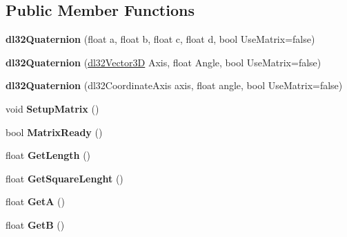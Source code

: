 \subsection*{Public Member Functions}
\begin{DoxyCompactItemize}
\item 
\hypertarget{classdl32_quaternion_adf3ab0776e0a8f458b07e57760c59555}{{\bfseries dl32\-Quaternion} (float a, float b, float c, float d, bool Use\-Matrix=false)}\label{classdl32_quaternion_adf3ab0776e0a8f458b07e57760c59555}

\item 
\hypertarget{classdl32_quaternion_ad6f9e8cb453d5ed618117c129de42d97}{{\bfseries dl32\-Quaternion} (\hyperlink{structdl32_vector3_d}{dl32\-Vector3\-D} Axis, float Angle, bool Use\-Matrix=false)}\label{classdl32_quaternion_ad6f9e8cb453d5ed618117c129de42d97}

\item 
\hypertarget{classdl32_quaternion_a71f6889b137be8410f3a0f977c293b5a}{{\bfseries dl32\-Quaternion} (dl32\-Coordinate\-Axis axis, float angle, bool Use\-Matrix=false)}\label{classdl32_quaternion_a71f6889b137be8410f3a0f977c293b5a}

\item 
\hypertarget{classdl32_quaternion_a28852df36bbf4b337a3b75fa3a21ac92}{void {\bfseries Setup\-Matrix} ()}\label{classdl32_quaternion_a28852df36bbf4b337a3b75fa3a21ac92}

\item 
\hypertarget{classdl32_quaternion_a809258c41ce52c057776bcebfa786561}{bool {\bfseries Matrix\-Ready} ()}\label{classdl32_quaternion_a809258c41ce52c057776bcebfa786561}

\item 
\hypertarget{classdl32_quaternion_a7877f67a1ad096eb97a68278069c3919}{float {\bfseries Get\-Length} ()}\label{classdl32_quaternion_a7877f67a1ad096eb97a68278069c3919}

\item 
\hypertarget{classdl32_quaternion_ab71d49a075b60f13083e1c89ad8bddea}{float {\bfseries Get\-Square\-Lenght} ()}\label{classdl32_quaternion_ab71d49a075b60f13083e1c89ad8bddea}

\item 
\hypertarget{classdl32_quaternion_aa4a30dd228bbb5eaf3d23dda97828c08}{float {\bfseries Get\-A} ()}\label{classdl32_quaternion_aa4a30dd228bbb5eaf3d23dda97828c08}

\item 
\hypertarget{classdl32_quaternion_a558527a2651754db3cccb48f6e32b19f}{float {\bfseries Get\-B} ()}\label{classdl32_quaternion_a558527a2651754db3cccb48f6e32b19f}


\end{DoxyCompactItemize}

